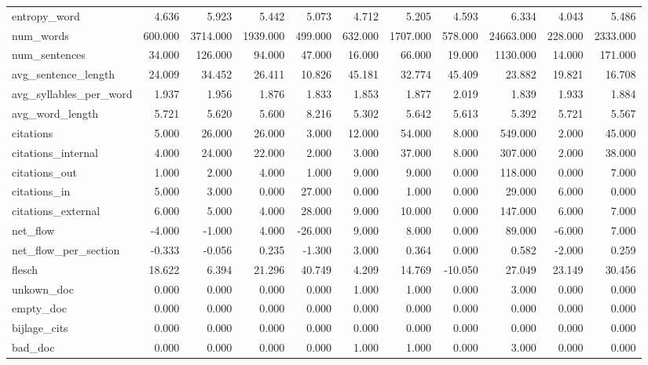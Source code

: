 \begin{tabular}{lrrrrrrrrrr}
\cline{1-11}
entropy\_word & 4.636 & 5.923 & 5.442 & 5.073 & 4.712 & 5.205 & 4.593 & 6.334 & 4.043 & 5.486 \\
\cline{1-11}
num\_words & 600.000 & 3714.000 & 1939.000 & 499.000 & 632.000 & 1707.000 & 578.000 & 24663.000 & 228.000 & 2333.000 \\
\cline{1-11}
num\_sentences & 34.000 & 126.000 & 94.000 & 47.000 & 16.000 & 66.000 & 19.000 & 1130.000 & 14.000 & 171.000 \\
\cline{1-11}
avg\_sentence\_length & 24.009 & 34.452 & 26.411 & 10.826 & 45.181 & 32.774 & 45.409 & 23.882 & 19.821 & 16.708 \\
\cline{1-11}
avg\_syllables\_per\_word & 1.937 & 1.956 & 1.876 & 1.833 & 1.853 & 1.877 & 2.019 & 1.839 & 1.933 & 1.884 \\
\cline{1-11}
avg\_word\_length & 5.721 & 5.620 & 5.600 & 8.216 & 5.302 & 5.642 & 5.613 & 5.392 & 5.721 & 5.567 \\
\cline{1-11}
citations & 5.000 & 26.000 & 26.000 & 3.000 & 12.000 & 54.000 & 8.000 & 549.000 & 2.000 & 45.000 \\
\cline{1-11}
citations\_internal & 4.000 & 24.000 & 22.000 & 2.000 & 3.000 & 37.000 & 8.000 & 307.000 & 2.000 & 38.000 \\
\cline{1-11}
citations\_out & 1.000 & 2.000 & 4.000 & 1.000 & 9.000 & 9.000 & 0.000 & 118.000 & 0.000 & 7.000 \\
\cline{1-11}
citations\_in & 5.000 & 3.000 & 0.000 & 27.000 & 0.000 & 1.000 & 0.000 & 29.000 & 6.000 & 0.000 \\
\cline{1-11}
citations\_external & 6.000 & 5.000 & 4.000 & 28.000 & 9.000 & 10.000 & 0.000 & 147.000 & 6.000 & 7.000 \\
\cline{1-11}
net\_flow & -4.000 & -1.000 & 4.000 & -26.000 & 9.000 & 8.000 & 0.000 & 89.000 & -6.000 & 7.000 \\
\cline{1-11}
net\_flow\_per\_section & -0.333 & -0.056 & 0.235 & -1.300 & 3.000 & 0.364 & 0.000 & 0.582 & -2.000 & 0.259 \\
\cline{1-11}
flesch & 18.622 & 6.394 & 21.296 & 40.749 & 4.209 & 14.769 & -10.050 & 27.049 & 23.149 & 30.456 \\
\cline{1-11}
unkown\_doc & 0.000 & 0.000 & 0.000 & 0.000 & 1.000 & 1.000 & 0.000 & 3.000 & 0.000 & 0.000 \\
\cline{1-11}
empty\_doc & 0.000 & 0.000 & 0.000 & 0.000 & 0.000 & 0.000 & 0.000 & 0.000 & 0.000 & 0.000 \\
\cline{1-11}
bijlage\_cits & 0.000 & 0.000 & 0.000 & 0.000 & 0.000 & 0.000 & 0.000 & 0.000 & 0.000 & 0.000 \\
\cline{1-11}
bad\_doc & 0.000 & 0.000 & 0.000 & 0.000 & 1.000 & 1.000 & 0.000 & 3.000 & 0.000 & 0.000 \\
\cline{1-11}
\bottomrule
\end{tabular}
